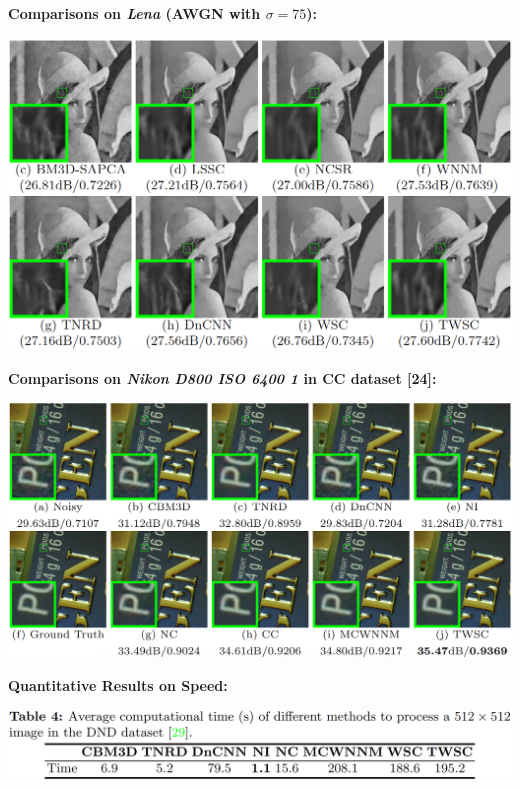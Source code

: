 \documentclass[landscape,fontscale=0.292,archE]{baposter}
\begin{document}
\begin{poster}
{    \vspace{3mm}
    \begin{minipage}[t]{0.45\textwidth}
        \textbf{\color{blue}Comparisons on \textsl{Lena} (AWGN with $\sigma=75$):}
     \vspace{-0mm}
        \begin{center}
            \includegraphics[width=\textwidth]{images/awgn}
        \end{center}
    \end{minipage}
    \hfill
    \begin{minipage}[t]{0.54\textwidth}
            \textbf{\color{blue}Comparisons on \textsl{Nikon D800 ISO 6400 1} in CC dataset [24]:}
        \vspace{-0mm}
        \begin{center}
            \includegraphics[width=\textwidth]{images/realcc}
        \end{center}
    \end{minipage}

\vspace{3mm}
    \begin{minipage}[t]{0.44\textwidth}
     \textbf{\color{blue}Quantitative Results on Speed:} 
        \vspace{-0mm}
        \begin{center}
            \includegraphics[width=\textwidth]{images/t4}
        \end{center}


\end{minipage}}
\end{poster}
\end{document}
